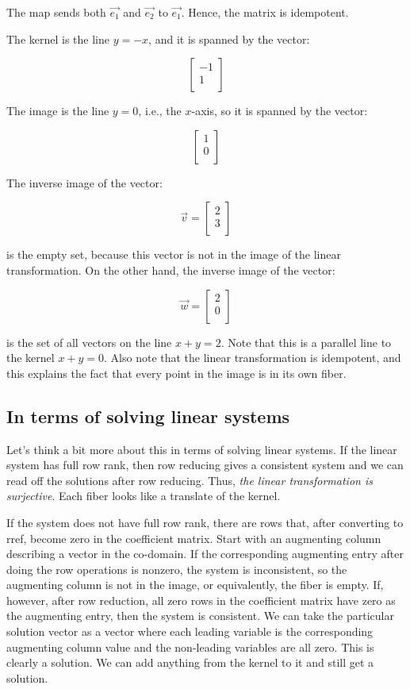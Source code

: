 \documentclass[10pt]{amsart}
\begin{document}
The map sends both $\vec{e_1}$ and $\vec{e_2}$ to $\vec{e_1}$. Hence,
the matrix is idempotent.

The kernel is the line $y = -x$, and it is spanned by the vector:

$$\left[\begin{matrix} -1 \\ 1 \\\end{matrix}\right]$$

The image is the line $y = 0$, i.e., the $x$-axis, so it is spanned by
the vector:

$$\left[\begin{matrix} 1 \\ 0 \\\end{matrix}\right]$$

The inverse image of the vector:

$$\vec{v} = \left[ \begin{matrix} 2 \\ 3 \\\end{matrix}\right]$$

is the empty set, because this vector is not in the image of the
linear transformation. On the other hand, the inverse image of the vector:

$$\vec{w} = \left[ \begin{matrix} 2 \\ 0 \\\end{matrix}\right]$$

is the set of all vectors on the line $x + y = 2$. Note that this is a
parallel line to the kernel $x + y = 0$. Also note that the linear
transformation is idempotent, and this explains the fact that every
point in the image is in its own fiber.

\subsection{In terms of solving linear systems}

Let's think a bit more about this in terms of solving linear
systems. If the linear system has full row rank, then row reducing
gives a consistent system and we can read off the solutions after row
reducing. Thus, {\em the linear transformation is surjective}. Each
fiber looks like a translate of the kernel.

If the system does not have full row rank, there are rows that, after
converting to rref, become zero in the coefficient matrix. Start with
an augmenting column describing a vector in the co-domain. If the
corresponding augmenting entry after doing the row operations is
nonzero, the system is inconsistent, so the augmenting column is not
in the image, or equivalently, the fiber is empty. If, however, after
row reduction, all zero rows in the coefficient matrix have zero as
the augmenting entry, then the system is consistent. We can take the
particular solution vector as a vector where each leading variable is
the corresponding augmenting column value and the non-leading
variables are all zero. This is clearly a solution. We can add
anything from the kernel to it and still get a solution.
\end{document}
